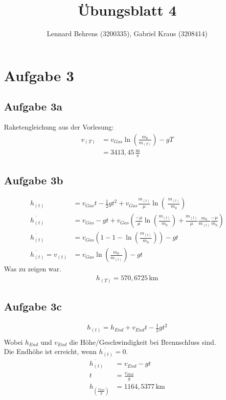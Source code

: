 \documentclass[a4paper,10pt]{extarticle}
\title{Übungsblatt 4}
\author{Lennard Behrens (3200335), Gabriel Kraus (3208414)}
\begin{document}
\maketitle

\section*{Aufgabe 3}
\subsection*{Aufgabe 3a}
Raketengleichung aus der Vorlesung:
\begin{align*}
v_{(T)} &= v_{Gas}\ln\left( \frac{m_0}{m_{(T)}}\right) - gT \\
&= 3413,45\,\frac{\mbox{m}}{\mbox{s}}
\end{align*}

\subsection*{Aufgabe 3b}
\begin{align*}
h_{(t)} &= v_{Gas}t - \frac{1}{2}gt^2 + v_{Gas} \frac{m_{(t)}}{\mu}\ln\left(\ \frac{m_{(t)}}{m_0} \right) \\
\dot{h_{(t)}} &= v_{Gas} - gt + v_{Gas} \left(\frac{- \mu}{\mu} \ln \left( \frac{m_{(t)}}{m_0}\right) + \frac{m_{(t)}}{\mu} \frac{m_0}{m_{(t)}} \frac{- \mu}{m_0} \right) \\
\dot{h_{(t)}} &= v_{Gas} \left(1-1-\ln \left( \frac{m_{(t)}}{m_0} \right)\right) - gt \\
\dot{h_{(t)}} = v_{(t)} &= v_{Gas} \ln \left( \frac{m_0}{m_{(t)}} \right) - gt
\end{align*}
Was zu zeigen war.
\begin{align*}
h_{(T)} = 570,6725 \, \mbox{km}
\end{align*}

\subsection*{Aufgabe 3c}
\begin{align*}
h_{(t)} = h_{End} + v_{End}t - \frac{1}{2}gt^2 \\
\end{align*}
Wobei $h_{End}$ und $v_{End}$ die Höhe/Geschwindigkeit bei Brennschluss sind. \\
Die Endhöhe ist erreicht, wenn $\dot{h_{(t)}} = 0$.
\begin{align*}
\dot{h_{(t)}} &= v_{End} - gt \\
t &= \frac{v_{End}}{g} \\
h_{(\frac{v_{End}}{g})} &= 1164,5377 \, \mbox{km}
\end{align*}
\end{document}
